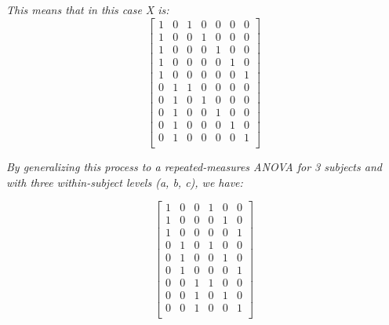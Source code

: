 \documentclass[a4paper,10pt]{article}
\begin{document}
\textit{This means that in this case X is:}
\begin{displaymath}
\left[\begin{array}{ccccccc}1 & 0 & 1 & 0 & 0 & 0 & 0\\ 
			    1 & 0 & 0 & 1 & 0 & 0 & 0\\
			    1 & 0 & 0 & 0 & 1 & 0 & 0\\
			    1 & 0 & 0 & 0 & 0 & 1 & 0\\
			    1 & 0 & 0 & 0 & 0 & 0 & 1\\    
			    0 & 1 & 1 & 0 & 0 & 0 & 0\\
			    0 & 1 & 0 & 1 & 0 & 0 & 0\\
			    0 & 1 & 0 & 0 & 1 & 0 & 0\\
			    0 & 1 & 0 & 0 & 0 & 1 & 0\\
			    0 & 1 & 0 & 0 & 0 & 0 & 1\\ 
\end{array}\right] 
\end{displaymath}

\textit{By generalizing this process to a repeated-measures ANOVA for 3 subjects and with three within-subject levels (a, b, c), we have:}

\begin{displaymath}
\left[\begin{array}{cccccc} 1 & 0 & 0 & 1 & 0 & 0 \\ 
			    1 & 0 & 0 & 0 & 1 & 0 \\
			    1 & 0 & 0 & 0 & 0 & 1 \\
			    0 & 1 & 0 & 1 & 0 & 0 \\
			    0 & 1 & 0 & 0 & 1 & 0 \\    
			    0 & 1 & 0 & 0 & 0 & 1 \\
			    0 & 0 & 1 & 1 & 0 & 0 \\
			    0 & 0 & 1 & 0 & 1 & 0 \\
			    0 & 0 & 1 & 0 & 0 & 1 \\
\end{array}\right] 
\end{displaymath}
\end{document}
